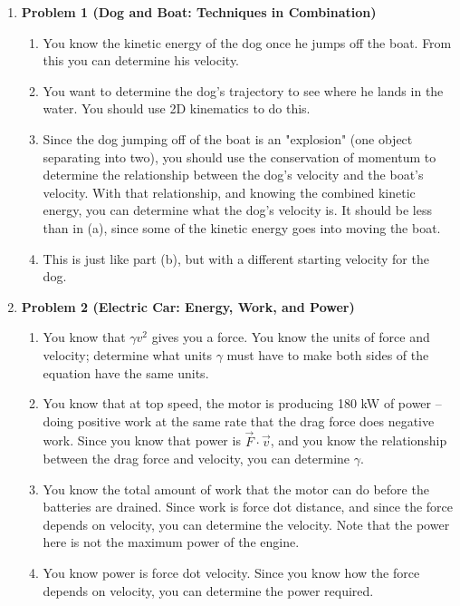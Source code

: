 \documentclass[12pt]{article}
\begin{document}
\begin{enumerate}
	\item \bf Problem 1 (Dog and Boat: Techniques in Combination)\rm 
	\begin{enumerate}
		\item You know the kinetic energy of the dog once he jumps off the boat. From this you can determine his velocity.

\item You want to determine the dog's trajectory to see where he lands in the water. You should use 2D kinematics to do this.
\item Since the dog jumping off of the boat is an "explosion" (one object separating into two), you should use the conservation of momentum to determine the relationship between the dog's velocity and the boat's velocity. With that relationship, and knowing the combined kinetic energy, you can determine what the dog's velocity is. It should be less than in (a), since some of the kinetic energy goes into moving the boat.
\item This is just like part (b), but with a different starting velocity for the dog.
\end{enumerate}

\vspace{0.6in}
\item \bf Problem 2 (Electric Car: Energy, Work, and Power)\rm 
\begin{enumerate}
	\item You know that $\gamma v^2$ gives you a force. You know the units of force and velocity; determine what units $\gamma$ must have to make both sides of the equation have the same units.
	\item  You know that at top speed, the motor is producing 180 kW of power -- doing positive work at the same rate that the drag force does negative work. Since you know that power is $\vec F \cdot \vec v$, and you know the relationship between the drag force and velocity, you can determine $\gamma$.
	\item  You know the total amount of work that the motor can do before the batteries are drained. Since work is force dot distance, and since the force depends on velocity, you can determine the velocity. Note that the power here is not the maximum power of the engine.
	\item  You know power is force dot velocity. Since you know how the force depends on velocity, you can determine the power required.
\end{enumerate}
\vspace{1in}


\end{enumerate}
\end{document}
